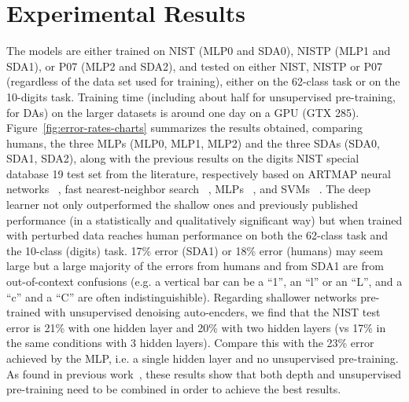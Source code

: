 \documentclass{article} %
\begin{document}
\vspace*{-2mm}
\section{Experimental Results}
\vspace*{-2mm}

The models are either trained on NIST (MLP0 and SDA0), 
NISTP (MLP1 and SDA1), or P07 (MLP2 and SDA2), and tested
on either NIST, NISTP or P07 (regardless of the data set used for training),
either on the 62-class task
or on the 10-digits task. Training time (including about half
for unsupervised pre-training, for DAs) on the larger
datasets is around one day on a GPU (GTX 285).
Figure~\ref{fig:error-rates-charts} summarizes the results obtained,
comparing humans, the three MLPs (MLP0, MLP1, MLP2) and the three SDAs (SDA0, SDA1,
SDA2), along with the previous results on the digits NIST special database
19 test set from the literature, respectively based on ARTMAP neural
networks ~\citep{Granger+al-2007}, fast nearest-neighbor search
~\citep{Cortes+al-2000-small}, MLPs ~\citep{Oliveira+al-2002-short}, and SVMs
~\citep{Milgram+al-2005}.%
The deep learner not only outperformed the shallow ones and
previously published performance (in a statistically and qualitatively
significant way) but when trained with perturbed data
reaches human performance on both the 62-class task
and the 10-class (digits) task. 
17\% error (SDA1) or 18\% error (humans) may seem large but a large
majority of the errors from humans and from SDA1 are from out-of-context
confusions (e.g. a vertical bar can be a ``1'', an ``l'' or an ``L'', and a
``c'' and a ``C'' are often indistinguishible).
Regarding shallower networks pre-trained with unsupervised denoising
auto-encders, we find that the NIST test error is 21\% with one hidden
layer and 20\% with two hidden layers (vs 17\% in the same conditions
with 3 hidden layers). Compare this with the 23\% error achieved
by the MLP, i.e. a single hidden layer and no unsupervised pre-training.
As found in previous work~\cite{Erhan+al-2010,Larochelle-jmlr-2009}, 
these results show that both depth and
unsupervised pre-training need to be combined in order to achieve
the best results.
\end{document}
